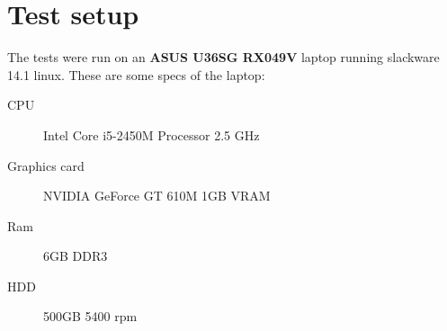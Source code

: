 
\chapter{Test setup}\label{app:setup}

The tests were run on an \textbf{ASUS U36SG RX049V} laptop running slackware 14.1 linux.  These are some specs of the laptop:


\begin{description}
    \item[CPU] Intel Core i5-2450M Processor 2.5 GHz
    \item[Graphics card] NVIDIA GeForce GT 610M 1GB VRAM
    \item[Ram] 6GB DDR3
    \item[HDD] 500GB 5400 rpm
\end{description}

